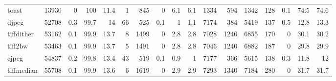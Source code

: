 \begin{tabular}{lrrrrrrrrrrrrrrrr}
 toast           &          13930 &    0   &       100   &   11.4 &     1 &     845 &    0   &      6.1 &           6.1 & 1334 &       594 &     1342 &  128 &    0.1 &     74.5 &          74.6 \\
 djpeg           &          52708 &    0.3 &        99.7 &   14   &    66 &     525 &    0.1 &      1   &           1.1 & 7174 &       384 &     5419 &  137 &    0.5 &     12.8 &          13.3 \\
 tiffdither      &          53162 &    0.1 &        99.9 &   13.7 &     8 &    1499 &    0   &      2.8 &           2.8 & 7028 &      1246 &     6855 &  170 &    0   &     30.1 &          30.2 \\
 tiff2bw         &          53463 &    0.1 &        99.9 &   13.7 &     5 &    1491 &    0   &      2.8 &           2.8 & 7046 &      1240 &     6882 &  187 &    0   &     29.8 &          29.9 \\
 cjpeg           &          54837 &    0.2 &        99.8 &   13.4 &    43 &     519 &    0.1 &      0.9 &           1   & 7177 &       366 &     5615 &  138 &    0.3 &     11.8 &          12   \\
 tiffmedian      &          55708 &    0.1 &        99.9 &   13.6 &     6 &    1619 &    0   &      2.9 &           2.9 & 7293 &      1340 &     7184 &  280 &    0   &     31.7 &          31.7 \\
\hline
\end{tabular}

